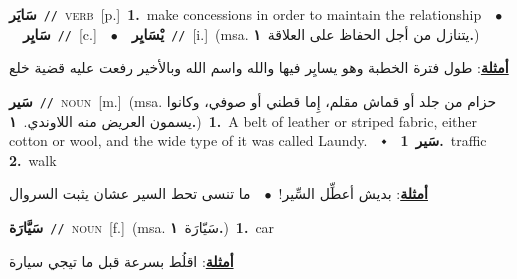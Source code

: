 \documentclass[10pt,a4paper,twoside]{article} %
\begin{document}
\begin{multicols}{2}
{\setlength\topsep{0pt}\textbf{\foreignlanguage{arabic}{سَايَر}}\ {\color{gray}\texttt{//}\color{black}}\ \textsc{verb}\ [p.]\ \textbf{1.}~make concessions in order to maintain the relationship\ \ $\bullet$\ \ \setlength\topsep{0pt}\textbf{\foreignlanguage{arabic}{سَايِر}}\ {\color{gray}\texttt{//}\color{black}}\ [c.]\ \ $\bullet$\ \ \setlength\topsep{0pt}\textbf{\foreignlanguage{arabic}{يْسَايِر}}\ {\color{gray}\texttt{//}\color{black}}\ [i.]\ \color{gray}(msa. \foreignlanguage{arabic}{يتنازل من أجل الحفاظ على العلاقة}~\foreignlanguage{arabic}{\textbf{١.}})\color{black}\  \begin{flushright}\color{gray}\foreignlanguage{arabic}{\textbf{\underline{\foreignlanguage{arabic}{أمثلة}}}: طول فترة الخطبة وهو يسايِر فيها والله واسم الله وبالأخير رفعت عليه قضية خلع}\end{flushright}\color{black}} \vspace{2mm}

{\setlength\topsep{0pt}\textbf{\foreignlanguage{arabic}{سَير}}\ {\color{gray}\texttt{//}\color{black}}\ \textsc{noun}\ [m.]\ \color{gray}(msa. \foreignlanguage{arabic}{حزام من جلد أو قماش مقلم، إِما قطني أو صوفي، وكانوا يسمون العريض منه اللاوندي.}~\foreignlanguage{arabic}{\textbf{١.}})\color{black}\ \textbf{1.}~A belt of leather or striped fabric, either cotton or wool, and the wide type of it was called Laundy.\ \ $\smblkdiamond$\ \ \setlength\topsep{0pt}\textbf{\foreignlanguage{arabic}{سَير}}\ \textbf{1.}~traffic  \textbf{2.}~walk\  \begin{flushright}\color{gray}\foreignlanguage{arabic}{\textbf{\underline{\foreignlanguage{arabic}{أمثلة}}}: بديش أعطِّل السِّير!\ $\bullet$\ \  ما تنسى تحط السير عشان يثبت السروال}\end{flushright}\color{black}} \vspace{2mm}

{\setlength\topsep{0pt}\textbf{\foreignlanguage{arabic}{سَيَّارَة}}\ {\color{gray}\texttt{//}\color{black}}\ \textsc{noun}\ [f.]\ \color{gray}(msa. \foreignlanguage{arabic}{سَيّارَة}~\foreignlanguage{arabic}{\textbf{١.}})\color{black}\ \textbf{1.}~car\  \begin{flushright}\color{gray}\foreignlanguage{arabic}{\textbf{\underline{\foreignlanguage{arabic}{أمثلة}}}: اقلُط بسرعة قبل ما تيجي سيارة}\end{flushright}\color{black}} \vspace{2mm}


\end{multicols}
\end{document}
